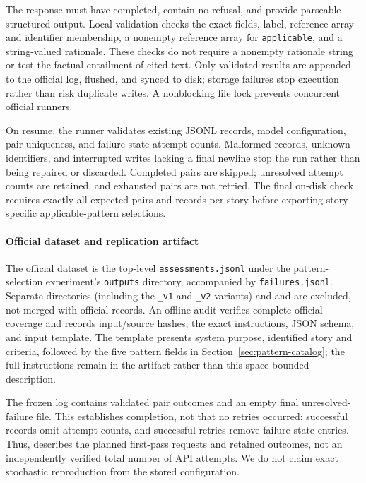 The response must have completed, contain no refusal, and provide parseable
structured output. Local validation checks the exact fields, label, reference
array and identifier membership, a nonempty reference array for
\texttt{applicable}, and a string-valued rationale. These checks do not require
a nonempty rationale string or test the factual entailment of cited text.
Only validated results are appended to the official log, flushed, and synced
to disk; storage failures stop execution rather than risk duplicate writes.
A nonblocking file lock prevents concurrent official runners.

On resume, the runner validates existing JSONL records, model configuration,
pair uniqueness, and failure-state attempt counts. Malformed records,
unknown identifiers, and interrupted writes lacking a final newline stop
the run rather than being repaired or discarded. Completed pairs are skipped;
unresolved attempt counts are retained, and exhausted pairs are not retried.
The final on-disk check requires exactly all \StudyAssessmentCount{} expected
pairs and \StudyPatternCount{} records per story before exporting
story-specific applicable-pattern selections.

\paragraph{Official dataset and replication artifact}
The official dataset is the top-level \texttt{assessments.jsonl} under the
pattern-selection experiment's \texttt{outputs} directory, accompanied by
\texttt{failures.jsonl}. Separate  directories
(including the \texttt{\_v1} and \texttt{\_v2} variants) and
 and  are excluded,
not merged with official records. An offline audit verifies complete official
coverage and records input/source hashes, the exact instructions, JSON schema,
and input template. The template presents system purpose, identified story and
criteria, followed by the five pattern fields in Section~\ref{sec:pattern-catalog};
the full instructions remain in the artifact rather than this space-bounded
description.

The frozen log contains \StudyAssessmentCount{} validated pair outcomes and
an empty final unresolved-failure file. This establishes completion, not that
no retries occurred: successful records omit attempt counts, and successful
retries remove failure-state entries. Thus, \StudyAssessmentCount{} describes
the planned first-pass requests and retained outcomes, not an independently
verified total number of API attempts. We do not claim exact stochastic
reproduction from the stored configuration.

